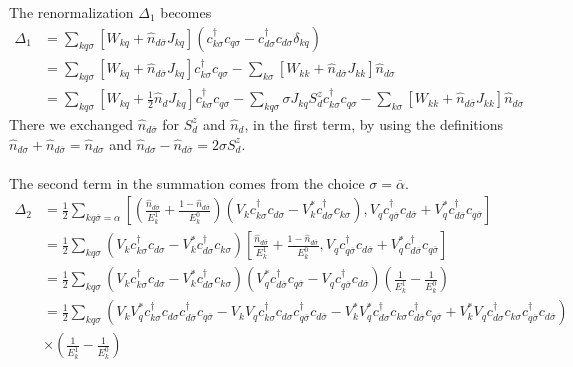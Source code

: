 \documentclass[twoside,11pt]{report}
\numberwithin{equation}{section}
\begin{document}
The renormalization \(\Delta_1\) becomes
\begin{equation}\begin{aligned}
	\Delta_1 &=\sum_{kq\sigma}\left[W_{kq} + \hat n_{d\overline\sigma}J_{kq}\right] \left(c^\dagger_{k\sigma}c_{q\sigma} - c^\dagger_{d\sigma}c_{d\sigma}\delta_{kq}\right)\\
		 &=\sum_{kq\sigma}\left[W_{kq} + \hat n_{d\overline\sigma}J_{kq}\right]c^\dagger_{k\sigma}c_{q\sigma} - \sum_{k\sigma}\left[W_{kk} + \hat n_{d\overline\sigma}J_{kk}\right]\hat n_{d\sigma}\\
		 &=\sum_{kq\sigma}\left[W_{kq} + \frac{1}{2} \hat n_d J_{kq}\right]c^\dagger_{k\sigma}c_{q\sigma} - \sum_{kq\sigma}\sigma J_{kq} S_d^z c^\dagger_{k\sigma}c_{q\sigma}- \sum_{k\sigma}\left[W_{kk} + \hat n_{d\overline\sigma}J_{kk}\right]\hat n_{d\sigma}
\end{aligned}\end{equation}
There we exchanged \(\hat n_{d\overline\sigma}\) for \(S_d^z\) and \(\hat n_d\), in the first term, by using the definitions \(\hat n_{d\sigma} + \hat n_{d\overline\sigma} = \hat n_{d\sigma}\) and \(\hat n_{d\sigma} - \hat n_{d\overline\sigma} = 2\sigma S_d^z\).
\\\\The second term in the summation comes from the choice \(\sigma = \overline\alpha\).
\begin{equation}\begin{aligned}
	\Delta_2 &= \frac{1}{2}\sum_{kq\overline\sigma=\alpha}\left[\left(\frac{\hat n_{d\overline\sigma}}{E_k^1} + \frac{1 - \hat n_{d\overline\sigma}}{E_k^0}\right)\left(V_k c^\dagger_{k\sigma}c_{d\sigma} - V^*_k c^\dagger_{d\sigma}c_{k\sigma}\right),V_q c^\dagger_{q\overline\sigma}c_{d\overline\sigma} + V_q^* c^\dagger_{d\overline\sigma}c_{q\overline\sigma}\right]\\
		 &= \frac{1}{2}\sum_{kq\sigma}\left(V_k c^\dagger_{k\sigma}c_{d\sigma} - V^*_k c^\dagger_{d\sigma}c_{k\sigma}\right)\left[\frac{\hat n_{d\overline\sigma}}{E_k^1} + \frac{1 - \hat n_{d\overline\sigma}}{E_k^0},V_q c^\dagger_{q\overline\sigma}c_{d\overline\sigma} + V_q^* c^\dagger_{d\overline\sigma}c_{q\overline\sigma}\right]\\
		 &= \frac{1}{2}\sum_{kq\sigma}\left(V_k c^\dagger_{k\sigma}c_{d\sigma} - V^*_k c^\dagger_{d\sigma}c_{k\sigma}\right)\left(V_q^*c^\dagger_{d\overline\sigma}c_{q\overline\sigma} - V_q c^\dagger_{q\overline\sigma}c_{d\overline\sigma}\right)\left(\frac{1}{E_k^1} - \frac{1}{E_k^0}\right)\\
		 &= \frac{1}{2}\sum_{kq\sigma}\left(V_k V_q^* c^\dagger_{k\sigma}c_{d\sigma} c^\dagger_{d\overline\sigma}c_{q\overline\sigma} - V_k V_q c^\dagger_{k\sigma}c_{d\sigma} c^\dagger_{q\overline\sigma}c_{d\overline\sigma} - V^*_k V_q^* c^\dagger_{d\sigma}c_{k\sigma} c^\dagger_{d\overline\sigma}c_{q\overline\sigma} + V^*_k V_q c^\dagger_{d\sigma}c_{k\sigma} c^\dagger_{q\overline\sigma}c_{d\overline\sigma}\right)\\
		 &\times\left(\frac{1}{E_k^1} - \frac{1}{E_k^0}\right)\\
\end{aligned}\end{equation}
\end{document}

